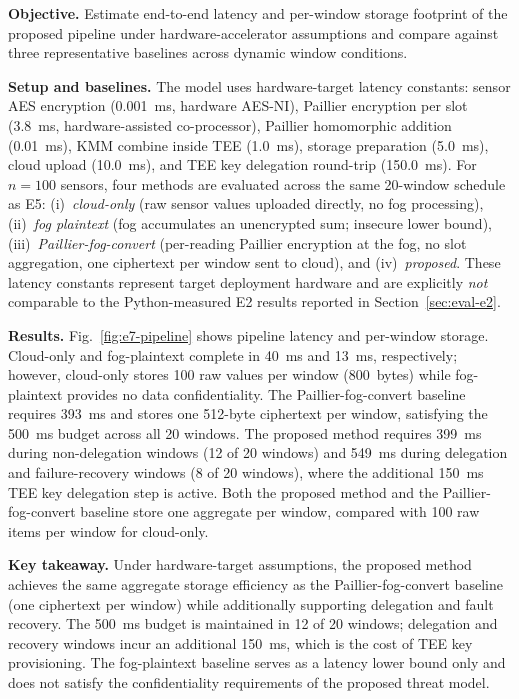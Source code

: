 \documentclass[conference]{IEEEtran}
\begin{document}
    \textbf{Objective.} Estimate end-to-end latency and per-window storage footprint of the proposed pipeline under hardware-accelerator assumptions and compare against three representative baselines across dynamic window conditions.

    \textbf{Setup and baselines.} The model uses hardware-target latency constants: sensor AES encryption (0.001~ms, hardware AES-NI), Paillier encryption per slot (3.8~ms, hardware-assisted co-processor), Paillier homomorphic addition (0.01~ms), KMM combine inside TEE (1.0~ms), storage preparation (5.0~ms), cloud upload (10.0~ms), and TEE key delegation round-trip (150.0~ms). For $n{=}100$ sensors, four methods are evaluated across the same 20-window schedule as E5: (i)~\emph{cloud-only} (raw sensor values uploaded directly, no fog processing), (ii)~\emph{fog plaintext} (fog accumulates an unencrypted sum; insecure lower bound), (iii)~\emph{Paillier-fog-convert} (per-reading Paillier encryption at the fog, no slot aggregation, one ciphertext per window sent to cloud), and (iv)~\emph{proposed}. These latency constants represent target deployment hardware and are explicitly \emph{not} comparable to the Python-measured E2 results reported in Section~\ref{sec:eval-e2}.

    \textbf{Results.} Fig.~\ref{fig:e7-pipeline} shows pipeline latency and per-window storage. Cloud-only and fog-plaintext complete in 40~ms and 13~ms, respectively; however, cloud-only stores 100 raw values per window (800~bytes) while fog-plaintext provides no data confidentiality. The Paillier-fog-convert baseline requires 393~ms and stores one 512-byte ciphertext per window, satisfying the 500~ms budget across all 20 windows. The proposed method requires 399~ms during non-delegation windows (12 of 20 windows) and 549~ms during delegation and failure-recovery windows (8 of 20 windows), where the additional 150~ms TEE key delegation step is active. Both the proposed method and the Paillier-fog-convert baseline store one aggregate per window, compared with 100 raw items per window for cloud-only.

    \textbf{Key takeaway.} Under hardware-target assumptions, the proposed method achieves the same aggregate storage efficiency as the Paillier-fog-convert baseline (one ciphertext per window) while additionally supporting delegation and fault recovery. The 500~ms budget is maintained in 12 of 20 windows; delegation and recovery windows incur an additional 150~ms, which is the cost of TEE key provisioning. The fog-plaintext baseline serves as a latency lower bound only and does not satisfy the confidentiality requirements of the proposed threat model.
\end{document}
